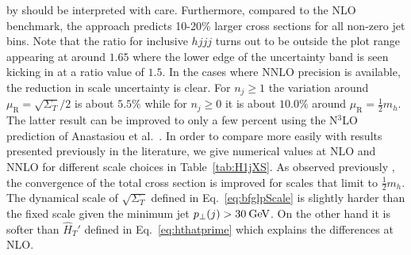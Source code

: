 by \Loopsim should be interpreted with care.
Furthermore, compared to the NLO benchmark, the \Minlo approach
predicts 10-20\% larger cross sections for all non-zero jet bins.
Note that the \Minlo ratio for inclusive $hjjj$ turns out to be
outside the plot range appearing at around $1.65$ where the lower edge
of the uncertainty band is seen kicking in at a ratio value of $1.5$.
In the cases where NNLO precision is available, the reduction in scale
uncertainty is clear. For $n_j\ge1$ the variation around
$\mu_\mathrm{R}=\sqrt{\Sigma_T}/2$ is about $5.5\%$ while for
$n_j\ge0$ it is about $10.0\%$ around $\mu_\mathrm{R}=\tfrac{1}{2}m_h$.
The latter result can be improved to only a few percent using the
N${}^3$LO prediction of Anastasiou et al.~\cite{Anastasiou:2015ema}.
In order to compare more easily with results presented previously in
the literature, we give numerical values at NLO and NNLO for different
scale choices in Table~\ref{tab:H1jXS}. As observed previously
\cite{Boughezal:2015dra}, the convergence of the total cross section
is improved for scales that limit to $\tfrac{1}{2}m_h$. The dynamical
scale of $\sqrt{\Sigma_T}$ defined in Eq.~\eqref{eq:bfglpScale} is
slightly harder than the fixed scale given the minimum jet
$p_\perp(j)>30\text{\:GeV}$. On the other hand it is softer than $\hat{H}_T'$
defined in Eq.~\eqref{eq:hthatprime} which explains the differences at
NLO.




